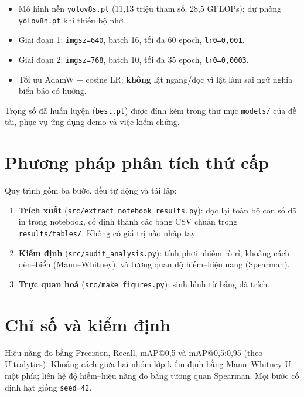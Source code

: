 \begin{itemize}
  \item Mô hình nền \texttt{yolov8s.pt} (11,13 triệu tham số, 28,5 GFLOPs); dự phòng
  \texttt{yolov8n.pt} khi thiếu bộ nhớ.
  \item Giai đoạn 1: \texttt{imgsz=640}, batch 16, tối đa 60 epoch, \texttt{lr0=0,001}.
  \item Giai đoạn 2: \texttt{imgsz=768}, batch 10, tối đa 35 epoch, \texttt{lr0=0,0003}.
  \item Tối ưu AdamW + cosine LR; \textbf{không} lật ngang/dọc vì lật làm sai ngữ nghĩa biển báo
  có hướng.
\end{itemize}

Trọng số đã huấn luyện (\texttt{best.pt}) được đính kèm trong thư mục \texttt{models/} của đề
tài, phục vụ ứng dụng demo và việc kiểm chứng.

\section{Phương pháp phân tích thứ cấp}

Quy trình gồm ba bước, đều tự động và tái lập:

\begin{enumerate}
  \item \textbf{Trích xuất} (\texttt{src/extract\_notebook\_results.py}): đọc lại toàn bộ con số
  đã in trong notebook, cố định thành các bảng CSV chuẩn trong \texttt{results/tables/}. Không có
  giá trị nào nhập tay.
  \item \textbf{Kiểm định} (\texttt{src/audit\_analysis.py}): tính phơi nhiễm rò rỉ, khoảng cách
  đèn--biển (Mann--Whitney), và tương quan độ hiếm--hiệu năng (Spearman).
  \item \textbf{Trực quan hoá} (\texttt{src/make\_figures.py}): sinh hình từ bảng đã trích.
\end{enumerate}

\section{Chỉ số và kiểm định}

Hiệu năng đo bằng Precision, Recall, mAP@0,5 và mAP@0,5:0,95 (theo Ultralytics). Khoảng cách giữa
hai nhóm lớp kiểm định bằng Mann--Whitney U một phía; liên hệ độ hiếm--hiệu năng đo bằng tương
quan Spearman. Mọi bước cố định hạt giống \texttt{seed=42}.
